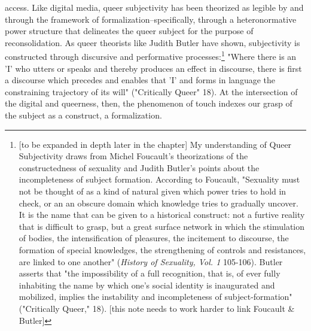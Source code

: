 \documentclass[11pt]{article}
\begin{document}
access. Like digital media, queer subjectivity has been theorized as
legible by and through the framework of formalization--specifically,
through a heteronormative power structure that delineates the queer
subject for the purpose of reconsolidation. As queer theorists like
Judith Butler have shown, subjectivity is constructed through
discursive and performative processes:\footnote{[to be expanded in depth later in the chapter] My understanding
of Queer Subjectivity draws from Michel Foucault's theorizations of
the constructedness of sexuality and Judith Butler's points about the
incompleteness of subject formation. According to Foucault, "Sexuality
must not be thought of as a kind of natural given which power tries to
hold in check, or an an obscure domain which knowledge tries to
gradually uncover. It is the name that can be given to a historical
construct: not a furtive reality that is difficult to grasp, but a
great surface network in which the stimulation of bodies, the
intensification of pleasures, the incitement to discourse, the
formation of special knowledges, the strengthening of controls and
resistances, are linked to one another" (\emph{History of Sexuality,
Vol. 1} 105-106). Butler asserts that "the impossibility of a full
recognition, that is, of ever fully inhabiting the name by which one's
social identity is inaugurated and mobilized, implies the instability
and incompleteness of subject-formation" ("Critically Queer,"
18). [this note needs to work harder to link Foucault \& Butler]} "Where there is an 'I'
who utters or speaks and thereby produces an effect in discourse,
there is first a discourse which precedes and enables that 'I' and
forms in language the constraining trajectory of its will"
("Critically Queer" 18). At the intersection of the digital and
queerness, then, the phenomenon of touch indexes our grasp of the
subject as a construct, a formalization.
\end{document}
